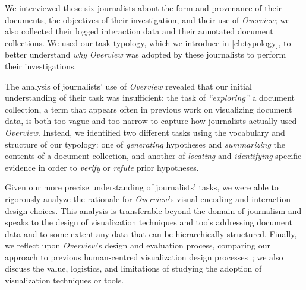 We interviewed these six journalists about the form and provenance of their documents, the objectives of their investigation, and their use of {\it Overview}; we also collected their logged interaction data and their annotated document collections.
We used our task typology, which we introduce in \autoref{ch:typology}, to better understand {\it why} {\it Overview} was adopted by these journalists to perform their investigations.

The analysis of journalists' use of {\it Overview} revealed that our initial understanding of their task was insufficient: the task of {\it ``exploring''} a document collection, a term that appears often in previous work on visualizing document data, is both too vague and too narrow to capture how journalists actually used {\it Overview}. 
Instead, we identified two different tasks using the vocabulary and structure of our typology: one of {\it generating} hypotheses and {\it summarizing} the contents of a document collection, and another of {\it locating} and {\it identifying} specific evidence in order to {\it verify} or {\it refute} prior hypotheses.

Given our more precise understanding of journalists' tasks, we were able to rigorously analyze the rationale for {\it Overview}'s visual encoding and interaction design choices.
This analysis is transferable beyond the domain of journalism and speaks to the design of visualization techniques and tools addressing document data and to some extent any data that can be hierarchically structured.
Finally, we reflect upon {\it Overview}'s design and evaluation process, comparing our approach to previous human-centred visualization design processes~\cite{Isenberg2008,Lloyd2011}; we also discuss the value, logistics, and limitations of studying the adoption of visualization techniques or tools.

